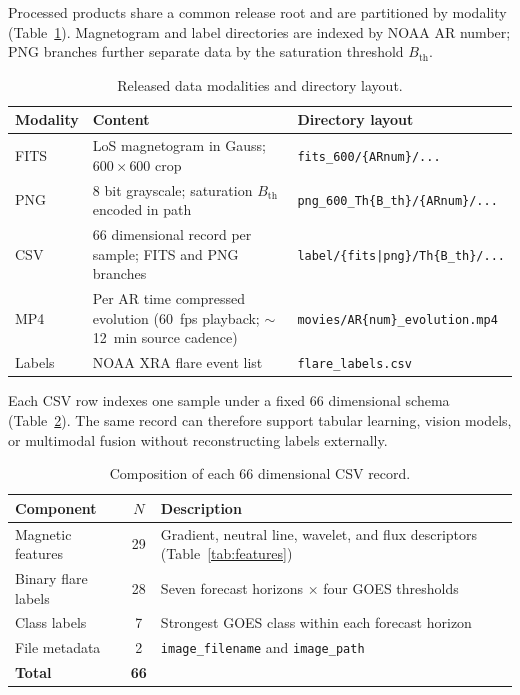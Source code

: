 \documentclass[universe,article,submit,moreauthors]{Definitions/mdpi}
\begin{document}
Processed products share a common release root and are partitioned by modality (Table~\ref{tab:modalities}). Magnetogram and label directories are indexed by NOAA AR number; PNG branches further separate data by the saturation threshold $B_{\mathrm{th}}$.

\begin{table}[H]
\caption{Released data modalities and directory layout.}
\label{tab:modalities}
\centering
\small
\begin{tabularx}{\textwidth}{@{}>{\raggedright\arraybackslash}p{1.8cm}X>{\raggedright\arraybackslash}p{4.6cm}@{}}
\toprule
\textbf{Modality} & \textbf{Content} & \textbf{Directory layout} \\
\midrule
FITS & LoS magnetogram in Gauss; $600\times600$ crop & \texttt{fits\_600/\{ARnum\}/...} \\
PNG & 8 bit grayscale; saturation $B_{\mathrm{th}}$ encoded in path & \texttt{png\_600\_Th\{B\_th\}/\{ARnum\}/...} \\
CSV & 66 dimensional record per sample; FITS and PNG branches & \texttt{label/\{fits|png\}/Th\{B\_th\}/...} \\
MP4 & Per AR time compressed evolution (60~fps playback; $\sim$12~min source cadence) & \texttt{movies/AR\{num\}\_evolution.mp4} \\
Labels & NOAA XRA flare event list & \texttt{flare\_labels.csv} \\
\bottomrule
\end{tabularx}
\end{table}

Each CSV row indexes one sample under a fixed 66 dimensional schema (Table~\ref{tab:schema}). The same record can therefore support tabular learning, vision models, or multimodal fusion without reconstructing labels externally.

\begin{table}[H]
\caption{Composition of each 66 dimensional CSV record.}
\label{tab:schema}
\centering
\small
\begin{tabularx}{\textwidth}{@{}>{\raggedright\arraybackslash}p{2.8cm}c>{\raggedright\arraybackslash}X@{}}
\toprule
\textbf{Component} & \textbf{$N$} & \textbf{Description} \\
\midrule
Magnetic features & 29 & Gradient, neutral line, wavelet, and flux descriptors (Table~\ref{tab:features}) \\
Binary flare labels & 28 & Seven forecast horizons $\times$ four GOES thresholds \\
Class labels & 7 & Strongest GOES class within each forecast horizon \\
File metadata & 2 & \texttt{image\_filename} and \texttt{image\_path} \\
\midrule
\textbf{Total} & \textbf{66} & \\
\bottomrule
\end{tabularx}
\end{table}
\end{document}
